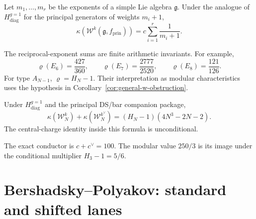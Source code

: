 \begin{corollary}
\label{cor:general-w-obstruction}
Let $m_1,\ldots,m_r$ be the exponents of a simple Lie algebra
$\mathfrak g$.  Under the analogue of
$H_{\mathrm{diag}}^{g=1}$ for the principal generators of weights
$m_i+1$,
\begin{equation}\label{eq:general-w-trace-repaired}
\kappa(\mathcal W^k(\mathfrak g,f_{\mathrm{prin}}))
=c\sum_{i=1}^r\frac1{m_i+1}.
\end{equation}
\end{corollary}

\begin{remark}
\label{rem:general-w-kappa-values}
The reciprocal-exponent sums are finite arithmetic invariants.  For
example,
\[
\varrho(E_6)=\frac{427}{360},\qquad
\varrho(E_7)=\frac{2777}{2520},\qquad
\varrho(E_8)=\frac{121}{126}.
\]
For type $A_{N-1}$, $\varrho=H_N-1$.  Their interpretation as modular
characteristics uses the hypothesis in
Corollary~\ref{cor:general-w-obstruction}.
\end{remark}

\begin{corollary}
\label{cor:wn-complementarity}
Under $H_{\mathrm{diag}}^{g=1}$ and the principal DS/bar companion
package,
\begin{equation}\label{eq:wn-kappa-companion-repaired}
\kappa(\mathcal W_N^k)+\kappa(\mathcal W_N^{k^\vee})
=(H_N-1)(4N^3-2N-2).
\end{equation}
The central-charge identity inside this formula is unconditional.
\end{corollary}

\begin{remark}
\label{rem:w3-kappa-sums}
The exact conductor is $c+c^\vee=100$.  The modular value
$250/3$ is its image under the conditional multiplier
$H_3-1=5/6$.
\end{remark}

\section{Bershadsky--Polyakov: standard and shifted lanes}

